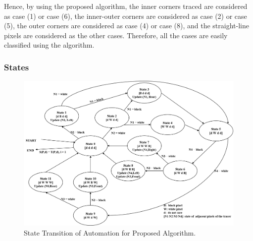 
Hence, by using the proposed algorithm, the inner corners traced are considered as case (1) or case (6), the inner-outer corners are considered as case (2) or case (5), the outer corners are considered as case (4) or case (8), and the straight-line pixels are considered as the other cases. Therefore, all the cases are easily classified using the algorithm. 




\subsubsection{States}

\begin{figure}[htbp]
	\centering
	\includegraphics[width=1.0\textwidth]{4.Proposed/state.png}
	\caption{State Transition of Automation for Proposed Algorithm.}
	\label{fig:image10}
\end{figure}


